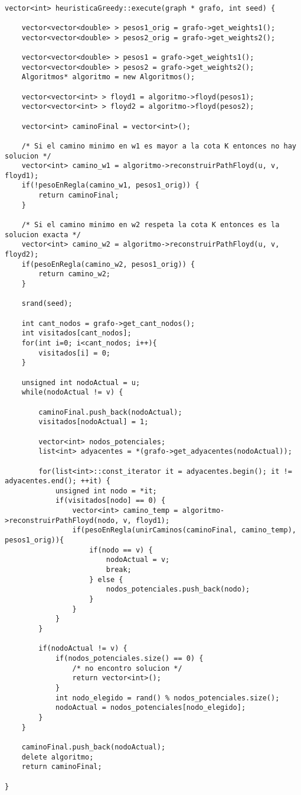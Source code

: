 \begin{lstlisting}

vector<int> heuristicaGreedy::execute(graph * grafo, int seed) {

	vector<vector<double> > pesos1_orig = grafo->get_weights1();
	vector<vector<double> > pesos2_orig = grafo->get_weights2();

	vector<vector<double> > pesos1 = grafo->get_weights1();
	vector<vector<double> > pesos2 = grafo->get_weights2();
	Algoritmos* algoritmo = new Algoritmos();

	vector<vector<int> > floyd1 = algoritmo->floyd(pesos1);
	vector<vector<int> > floyd2 = algoritmo->floyd(pesos2);
	
	vector<int> caminoFinal = vector<int>();

	/* Si el camino minimo en w1 es mayor a la cota K entonces no hay solucion */
	vector<int> camino_w1 = algoritmo->reconstruirPathFloyd(u, v, floyd1);
	if(!pesoEnRegla(camino_w1, pesos1_orig)) {
		return caminoFinal;
	}

	/* Si el camino minimo en w2 respeta la cota K entonces es la solucion exacta */
	vector<int> camino_w2 = algoritmo->reconstruirPathFloyd(u, v, floyd2);
	if(pesoEnRegla(camino_w2, pesos1_orig)) {
		return camino_w2;
	}
	
	srand(seed);

	int cant_nodos = grafo->get_cant_nodos();
	int visitados[cant_nodos];
	for(int i=0; i<cant_nodos; i++){
		visitados[i] = 0;
	}
	
	unsigned int nodoActual = u;
	while(nodoActual != v) {	
		
		caminoFinal.push_back(nodoActual);								
		visitados[nodoActual] = 1;
		
		vector<int> nodos_potenciales;
		list<int> adyacentes = *(grafo->get_adyacentes(nodoActual));
		
		for(list<int>::const_iterator it = adyacentes.begin(); it != adyacentes.end(); ++it) {
			unsigned int nodo = *it;
			if(visitados[nodo] == 0) {
				vector<int> camino_temp = algoritmo->reconstruirPathFloyd(nodo, v, floyd1);
				if(pesoEnRegla(unirCaminos(caminoFinal, camino_temp), pesos1_orig)){
					if(nodo == v) {
						nodoActual = v;
						break;
					} else {
						nodos_potenciales.push_back(nodo);
					}
				}
			}
		}
		
		if(nodoActual != v) {
			if(nodos_potenciales.size() == 0) {
				/* no encontro solucion */
				return vector<int>();
			}
			int nodo_elegido = rand() % nodos_potenciales.size();	
			nodoActual = nodos_potenciales[nodo_elegido];
		}
	}

	caminoFinal.push_back(nodoActual);
	delete algoritmo;
	return caminoFinal;
		
}

\end{lstlisting}

